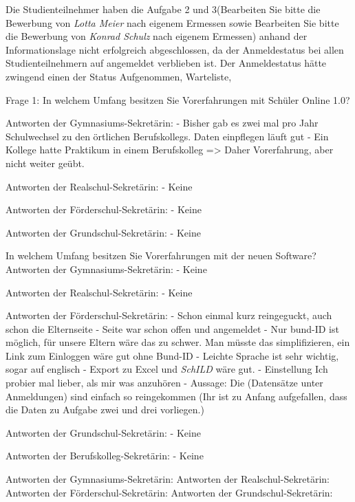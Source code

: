 Die Studienteilnehmer haben die Aufgabe 2 und 3(\glqq Bearbeiten Sie bitte die Bewerbung von \textit{Lotta Meier} nach eigenem Ermessen\grqq{} sowie \glqq Bearbeiten Sie bitte die Bewerbung von \textit{Konrad Schulz} nach eigenem Ermessen\grqq{}) anhand der Informationslage nicht erfolgreich abgeschlossen, da der Anmeldestatus bei allen Studienteilnehmern auf \glqq angemeldet\grqq{} verblieben ist. Der Anmeldestatus hätte zwingend einen der Status \glqq Aufgenommen\grqq{}, \glqq Warteliste\grqq{},\grqq{}\glqq 



Frage 1: In welchem Umfang besitzen Sie Vorerfahrungen mit Schüler Online 1.0? 	

Antworten der Gymnasiums-Sekretärin:
- Bisher gab es zwei mal pro Jahr Schulwechsel zu den örtlichen Berufskollegs. Daten einpflegen läuft gut
- Ein Kollege hatte Praktikum in einem Berufskolleg => Daher Vorerfahrung, aber nicht weiter geübt.

Antworten der Realschul-Sekretärin:
- Keine	

Antworten der Förderschul-Sekretärin:
- Keine

Antworten der Grundschul-Sekretärin:
- Keine


In welchem Umfang besitzen Sie Vorerfahrungen mit der neuen Software?		
Antworten der Gymnasiums-Sekretärin:
- Keine				

Antworten der Realschul-Sekretärin:
- Keine				

Antworten der Förderschul-Sekretärin:
- Schon einmal kurz reingeguckt, auch schon die Elternseite
- Seite war schon offen und angemeldet	
- Nur bund-ID ist möglich, für unsere Eltern wäre das zu schwer. Man müsste das simplifizieren, ein Link zum Einloggen wäre gut ohne Bund-ID
- Leichte Sprache ist sehr wichtig, sogar auf englisch
- Export zu Excel und \textit{SchILD} wäre gut.
- Einstellung \glqq Ich probier mal lieber, als mir was anzuhören\grqq{}
- Aussage: \glqq Die (Datensätze unter Anmeldungen) sind einfach so reingekommen\grqq{} (Ihr ist zu Anfang aufgefallen, dass die Daten zu Aufgabe zwei und drei vorliegen.)			

Antworten der Grundschul-Sekretärin:
- Keine		

Antworten der Berufskolleg-Sekretärin:
- Keine				







Antworten der Gymnasiums-Sekretärin:
Antworten der Realschul-Sekretärin:
Antworten der Förderschul-Sekretärin:
Antworten der Grundschul-Sekretärin:
